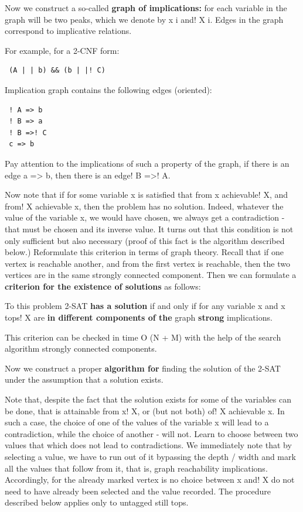 Now we construct a so-called \textbf{graph of implications:} for each variable in the graph will be two peaks, which we denote by x i and! X i. Edges in the graph correspond to implicative relations.

For example, for a 2-CNF form:

\begin{verbatim}
 (A | | b) && (b | |! C) 
\end{verbatim}
Implication graph contains the following edges (oriented):

\begin{verbatim}
 ! A => b
 ! B => a
 ! B =>! C
 c => b 
\end{verbatim}
Pay attention to the implications of such a property of the graph, if there is an edge a => b, then there is an edge! B =>! A.

Now note that if for some variable x is satisfied that from x achievable! X, and from! X achievable x, then the problem has no solution. Indeed, whatever the value of the variable x, we would have chosen, we always get a contradiction - that must be chosen and its inverse value. It turns out that this condition is not only sufficient but also necessary (proof of this fact is the algorithm described below.) Reformulate this criterion in terms of graph theory. Recall that if one vertex is reachable another, and from the first vertex is reachable, then the two vertices are in the same strongly connected component. Then we can formulate a \textbf{criterion for the existence of solutions} as follows:

To this problem 2-SAT \textbf{has a solution} if and only if for any variable x and x tops! X are \textbf{in different components of the} graph \textbf{strong} implications.

This criterion can be checked in time O (N + M) with the help of the search algorithm strongly connected components.

Now we construct a proper \textbf{algorithm for} finding the solution of the 2-SAT under the assumption that a solution exists.

Note that, despite the fact that the solution exists for some of the variables can be done, that is attainable from x! X, or (but not both) of! X achievable x. In such a case, the choice of one of the values ​​of the variable x will lead to a contradiction, while the choice of another - will not. Learn to choose between two values ​​that which does not lead to contradictions. We immediately note that by selecting a value, we have to run out of it bypassing the depth / width and mark all the values ​​that follow from it, that is, graph reachability implications. Accordingly, for the already marked vertex is no choice between x and! X do not need to have already been selected and the value recorded. The procedure described below applies only to untagged still tops.

